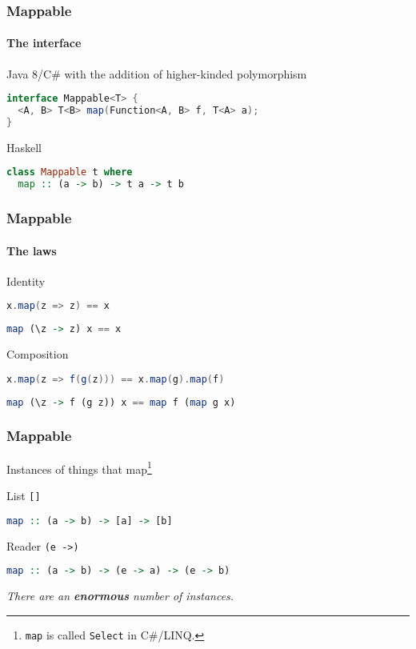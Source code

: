 \begin{frame}[fragile]
\frametitle{Mappable}
\framesubtitle{The interface}
\begin{block}{Java 8/C\# with the addition of higher-kinded polymorphism}
\begin{lstlisting}[style=language,language=java]
interface Mappable<T> {
  <A, B> T<B> map(Function<A, B> f, T<A> a);
}
\end{lstlisting}
\end{block}
\begin{block}{Haskell}
\begin{lstlisting}[style=language,language=haskell]
class Mappable t where
  map :: (a -> b) -> t a -> t b
\end{lstlisting}
\end{block}
\end{frame}

\begin{frame}[fragile]
\frametitle{Mappable}
\framesubtitle{The laws}
\begin{block}{Identity}
\begin{lstlisting}[style=language,language=java]
x.map(z => z) == x
\end{lstlisting}
\begin{lstlisting}[style=language,language=haskell]
map (\z -> z) x == x
\end{lstlisting}
\end{block}
\begin{block}{Composition}
\begin{lstlisting}[style=language,language=java]
x.map(z => f(g(z))) == x.map(g).map(f)
\end{lstlisting}
\begin{lstlisting}[style=language,language=haskell]
map (\z -> f (g z)) x == map f (map g x)
\end{lstlisting}
\end{block}
\end{frame}

\begin{frame}[fragile]
\frametitle{Mappable}
Instances of things that map\footnote{\lstinline{map} is called \lstinline{Select} in C\#/LINQ.}
\begin{block}{List \lstinline{[]}}
\begin{lstlisting}[style=language,language=haskell]
map :: (a -> b) -> [a] -> [b]
\end{lstlisting}
\end{block}
\begin{block}{Reader \lstinline{(e ->)}}
\begin{lstlisting}[style=language,language=haskell]
map :: (a -> b) -> (e -> a) -> (e -> b)
\end{lstlisting}
\end{block}
\emph{There are an \textbf{enormous} number of instances.}
\end{frame}

